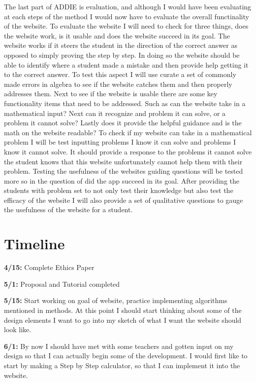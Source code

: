\documentclass[10pt,twocolumn]{article}
\begin{document}
The last part of ADDIE is evaluation, and although I would have been evaluating at each steps of the method I would now have to evaluate the overall functinality of the website. To evaluate the website I will need to check for three things, does the website work, is it usable and does the website succeed in its goal. The website works if it steers the student in the direction of the correct answer as opposed to simply proving the step by step. In doing so the website should be able to identify where a student made a mistake and then provide help getting it to the correct answer. To test this aspect I will use curate a set of commonly made errors in algebra to see if the website catches them and then properly addresses them.  %
Next to see if the website is usable there are some key functionality items that need to be addressed. Such as can the website take in a mathematical input? Next can it recognize and problem it can solve, or a problem it cannot solve? Lastly does it provide the helpful guidance and is the math on the website readable? To check if my website can take in a mathematical problem I will be test inputting problems I know it can solve and problems I know it cannot solve. It should provide a response to the problems it cannot solve the student knows that this website unfortunately cannot help them with their problem. Testing the usefulness of the websites guiding questions will be tested more so in the question of did the app succeed in its goal. After providing the students with problem set to not only test their knowledge but also test the efficacy of the website I will also provide a set of qualitative questions to gauge the usefulness of the website for a student.

\section{Timeline}

\textbf{4/15:} 
Complete Ethics Paper

\textbf{5/1:} 
Proposal and Tutorial completed

\textbf{5/15:}  
Start working on goal of website, practice implementing algorithms mentioned in methods. At this point I should start thinking about some of the design elements I want to go into my sketch of what I want the website should look like. 

\textbf{6/1:} 
By now I should have met with some teachers and gotten input on my design so that I can actually begin some of the development. I would first like to start by making a Step by Step calculator, so that I can implement it into the website.
\end{document}
